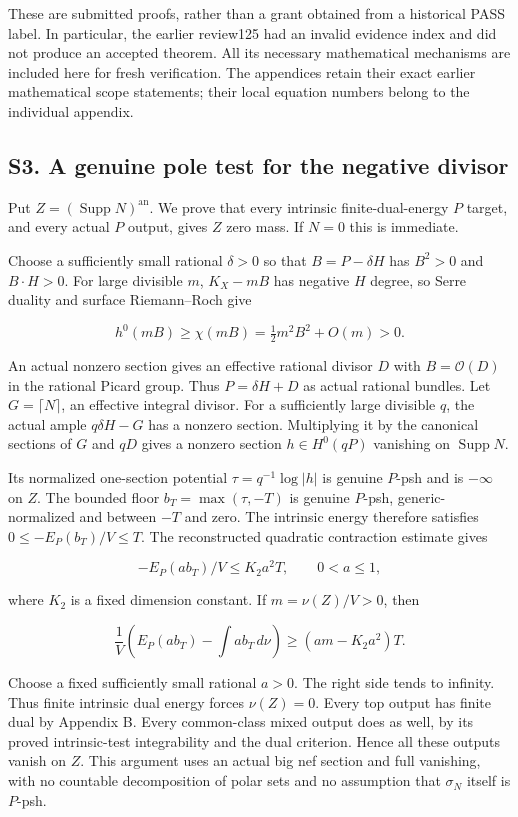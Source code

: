 \documentclass[
  10pt,
]{article}
\begin{document}
These are submitted proofs, rather than a grant obtained from a
historical PASS label. In particular, the earlier review125 had an
invalid evidence index and did not produce an accepted theorem. All its
necessary mathematical mechanisms are included here for fresh
verification. The appendices retain their exact earlier mathematical
scope statements; their local equation numbers belong to the individual
appendix.

\subsection{S3. A genuine pole test for the negative
divisor}\label{s3.-a-genuine-pole-test-for-the-negative-divisor}

Put \(Z=(\operatorname{Supp}N)^{\mathrm{an}}\). We prove that every
intrinsic finite-dual-energy \(P\) target, and every actual \(P\)
output, gives \(Z\) zero mass. If \(N=0\) this is immediate.

Choose a sufficiently small rational \(\delta>0\) so that
\(B=P-\delta H\) has \(B^2>0\) and \(B\cdot H>0\). For large divisible
\(m\), \(K_X-mB\) has negative \(H\) degree, so Serre duality and
surface Riemann--Roch give

\[h^0(mB)\geq\chi(mB)=\tfrac12m^2B^2+O(m)>0.\]

An actual nonzero section gives an effective rational divisor \(D\) with
\(B=\mathcal O(D)\) in the rational Picard group. Thus \(P=\delta H+D\)
as actual rational bundles. Let \(G=\lceil N\rceil\), an effective
integral divisor. For a sufficiently large divisible \(q\), the actual
ample \(q\delta H-G\) has a nonzero section. Multiplying it by the
canonical sections of \(G\) and \(qD\) gives a nonzero section
\(h\in H^0(qP)\) vanishing on \(\operatorname{Supp}N\).

Its normalized one-section potential \(\tau=q^{-1}\log|h|\) is genuine
\(P\)-psh and is \(-\infty\) on \(Z\). The bounded floor
\(b_T=\max(\tau,-T)\) is genuine \(P\)-psh, generic-normalized and
between \(-T\) and zero. The intrinsic energy therefore satisfies
\(0\leq -E_P(b_T)/V\leq T\). The reconstructed quadratic contraction
estimate gives

\[-E_P(a b_T)/V\leq K_2a^2T,\qquad 0<a\leq1,\]

where \(K_2\) is a fixed dimension constant. If \(m=\nu(Z)/V>0\), then

\[\frac1V\left(E_P(a b_T)-\int a b_T\,d\nu\right)\geq(am-K_2a^2)T.\]

Choose a fixed sufficiently small rational \(a>0\). The right side tends
to infinity. Thus finite intrinsic dual energy forces \(\nu(Z)=0\).
Every top output has finite dual by Appendix B. Every common-class mixed
output does as well, by its proved intrinsic-test integrability and the
dual criterion. Hence all these outputs vanish on \(Z\). This argument
uses an actual big nef section and full vanishing, with no countable
decomposition of polar sets and no assumption that \(\sigma_N\) itself
is \(P\)-psh.
\end{document}
